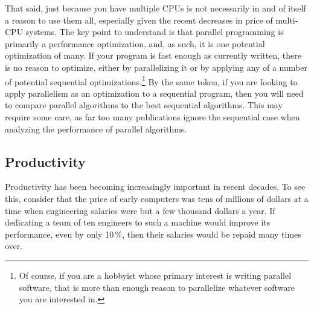 That said, just because you have multiple CPUs is not necessarily
in and of itself a reason to use them all, especially given the
recent decreases in price of multi-CPU systems.
The key point to understand is that parallel programming is primarily
a performance optimization, and, as such, it is one potential optimization
of many.
If your program is fast enough as currently written, there is no
reason to optimize, either by parallelizing it or by applying any
of a number of potential sequential optimizations.\footnote{
	Of course, if you are a hobbyist whose primary interest is
	writing parallel software, that is more than enough reason to
	parallelize whatever software you are interested in.}
By the same token, if you are looking to apply parallelism as an
optimization to a sequential program, then you will need to compare
parallel algorithms to the best sequential algorithms.
This may require some care, as far too many publications ignore the
sequential case when analyzing the performance of parallel algorithms.

\subsection{Productivity}
\label{sec:intro:Productivity}

\QuickQuizEnd

Productivity has been becoming increasingly important in recent decades.
To see this, consider that the price of early computers was tens
of millions of dollars at
a time when engineering salaries were but a few thousand dollars a year.
If dedicating a team of ten engineers to such a machine would improve
its performance, even by only 10\,\%, then their salaries
would be repaid many times over.

